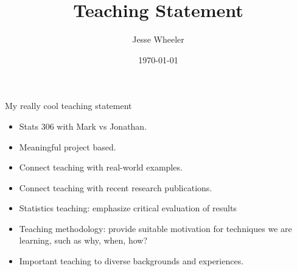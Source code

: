 \documentclass{article}
\title{Teaching Statement}
\author{Jesse Wheeler}
\date{\today}
\begin{document}
\rule{0mm}{1mm}
\vspace{-20mm}


\vspace{1mm}

\rule{0mm}{1mm}

\vspace{3mm}
\rule{0mm}{1mm}

\vspace{4mm}

\noindent My really cool teaching statement

\begin{itemize}
  \item Stats 306 with Mark vs Jonathan.
  \item Meaningful project based.
  \item Connect teaching with real-world examples.
  \item Connect teaching with recent research publications.
  \item Statistics teaching: emphasize critical evaluation of results
  \item Teaching methodology: provide suitable motivation for techniques we are learning, such as why, when, how?
  \item Important teaching to diverse backgrounds and experiences.
\end{itemize}



\end{document}
